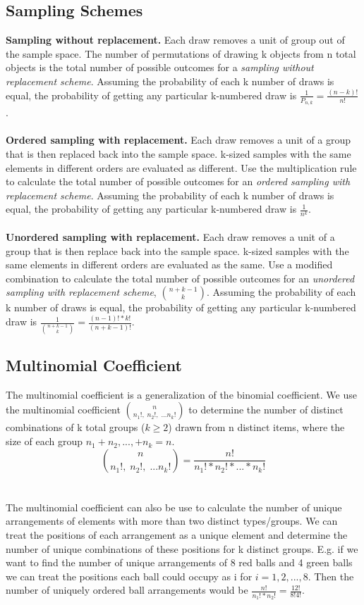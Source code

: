 \documentclass[fleqn]{article}
\begin{document}
\subsection{Sampling Schemes}
\textbf{Sampling without replacement.} Each draw removes a unit of group out of the sample space. The number of permutations of drawing k objects from n total objects is the total number of possible outcomes for a \textit{sampling without replacement scheme}. Assuming the probability of each k number of draws is equal, the probability of getting any particular k-numbered draw is $\frac{1}{P_{n,k}} = \frac{(n-k)!}{n!}$.\\ \\
\textbf{Ordered sampling with replacement.} Each draw removes a unit of a group that is then replaced back into the sample space. k-sized samples with the same elements in different orders are evaluated as different. Use the multiplication rule to calculate the total number of possible outcomes for an \textit{ordered sampling with replacement scheme}. Assuming the probability of each k number of draws is equal, the probability of getting any particular k-numbered draw is $\frac{1}{n^k}$.\\ \\
\textbf{Unordered sampling with replacement.} Each draw removes a unit of a group that is then replace back into the sample space.  k-sized samples with the same elements in different orders are evaluated as the same. Use a modified combination to calculate the total number of possible outcomes for an \textit{unordered sampling with replacement scheme}, $\binom{n + k -1}{k}$. Assuming the probability of each k number of draws is equal, the probability of getting any particular k-numbered draw is $\frac{1}{\binom{n + k -1}{k}} = \frac{(n-1)!*k!}{(n+k-1)!}$.\\
\subsection{Multinomial Coefficient}
The multinomial coefficient is a generalization of the binomial coefficient. We use the multinomial coefficient $\binom{n}{n_1!,\;n_2!,\;...n_k!}$ to determine the number of distinct combinations of k total groups ($k \geq 2$) drawn from n distinct items, where the size of each group $n_1 + n_2,..., + n_k = n$. $$\binom{n}{n_1!,\;n_2!,\;...n_k!} = \frac{n!}{n_1!*n_2!*...*n_k!}$$\\ \\
The multinomial coefficient can also be use to calculate the number of unique arrangements of elements with more than two distinct types/groups. We can treat the positions of each arrangement as a unique element and determine the number of unique combinations of these positions for k distinct groups. E.g. if we want to find the number of unique arrangements of 8 red balls and 4 green balls we can treat the positions each ball could occupy as i for $ i = {1,2,...,8}$. Then the number of uniquely ordered ball arrangements would be $\frac{n!}{n_1! * n_2!} = \frac{12!}{8!4!}$. 
\end{document}
